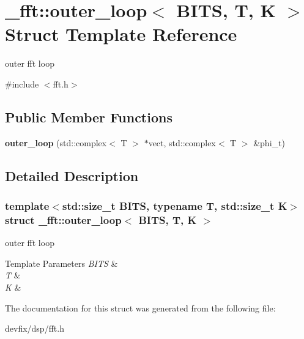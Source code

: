 \hypertarget{struct__fft_1_1outer__loop}{}\section{\+\_\+fft\+:\+:outer\+\_\+loop$<$ B\+I\+TS, T, K $>$ Struct Template Reference}
\label{struct__fft_1_1outer__loop}


outer fft loop  




{\ttfamily \#include $<$fft.\+h$>$}

\subsection*{Public Member Functions}
\begin{DoxyCompactItemize}
\item 
\mbox{\label{struct__fft_1_1outer__loop_ad65e0eb1582270ba89351eb4f75629b5}} 
{\bfseries outer\+\_\+loop} (std\+::complex$<$ T $>$ $\ast$vect, std\+::complex$<$ T $>$ \&phi\+\_\+t)
\end{DoxyCompactItemize}


\subsection{Detailed Description}
\subsubsection*{template$<$std\+::size\+\_\+t B\+I\+TS, typename T, std\+::size\+\_\+t K$>$\newline
struct \+\_\+fft\+::outer\+\_\+loop$<$ B\+I\+T\+S, T, K $>$}

outer fft loop 


\begin{DoxyTemplParams}{Template Parameters}
{\em B\+I\+TS} & \\
\hline
{\em T} & \\
\hline
{\em K} & \\
\hline
\end{DoxyTemplParams}


The documentation for this struct was generated from the following file\+:\begin{DoxyCompactItemize}
\item 
devfix/dsp/fft.\+h\end{DoxyCompactItemize}
